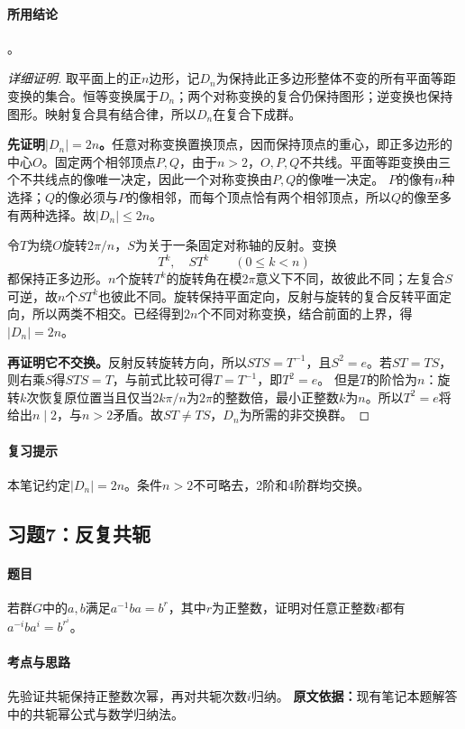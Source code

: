\paragraph{所用结论}
。
\begin{proof}[详细证明]
取平面上的正$n$边形，记$D_n$为保持此正多边形整体不变的所有平面等距变换的集合。恒等变换属于$D_n$；两个对称变换的复合仍保持图形；逆变换也保持图形。映射复合具有结合律，所以$D_n$在复合下成群。

\textbf{先证明$|D_n|=2n$。}任意对称变换置换顶点，因而保持顶点的重心，即正多边形的中心$O$。固定两个相邻顶点$P,Q$，由于$n>2$，$O,P,Q$不共线。平面等距变换由三个不共线点的像唯一决定，因此一个对称变换由$P,Q$的像唯一决定。
$P$的像有$n$种选择；$Q$的像必须与$P$的像相邻，而每个顶点恰有两个相邻顶点，所以$Q$的像至多有两种选择。故$|D_n|\leq2n$。

令$T$为绕$O$旋转$2\pi/n$，$S$为关于一条固定对称轴的反射。变换
\[
T^k,\quad ST^k\qquad(0\leq k<n)
\]
都保持正多边形。$n$个旋转$T^k$的旋转角在模$2\pi$意义下不同，故彼此不同；左复合$S$可逆，故$n$个$ST^k$也彼此不同。旋转保持平面定向，反射与旋转的复合反转平面定向，所以两类不相交。已经得到$2n$个不同对称变换，结合前面的上界，得$|D_n|=2n$。

\textbf{再证明它不交换。}反射反转旋转方向，所以$STS=T^{-1}$，且$S^2=e$。若$ST=TS$，则右乘$S$得$STS=T$，与前式比较可得$T=T^{-1}$，即$T^2=e$。
但是$T$的阶恰为$n$：旋转$k$次恢复原位置当且仅当$2k\pi/n$为$2\pi$的整数倍，最小正整数$k$为$n$。所以$T^2=e$将给出$n\mid2$，与$n>2$矛盾。故$ST\ne TS$，$D_n$为所需的非交换群。
\end{proof}
\paragraph{复习提示}
本笔记约定$|D_n|=2n$。条件$n>2$不可略去，2阶和4阶群均交换。

\subsection{习题7：反复共轭}
\paragraph{题目}
若群$G$中的$a,b$满足$a^{-1}ba=b^r$，其中$r$为正整数，证明对任意正整数$i$都有$a^{-i}ba^i=b^{r^i}$。
\paragraph{考点与思路}
先验证共轭保持正整数次幂，再对共轭次数$i$归纳。
\textbf{原文依据：}现有笔记本题解答中的共轭幂公式与数学归纳法。
